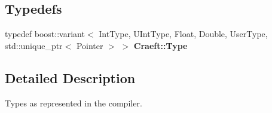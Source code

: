 \subsection*{Typedefs}
\begin{DoxyCompactItemize}
\item 
\hypertarget{_type_8hh_a6507025a334dad2cea0667990ee49050}{}\label{_type_8hh_a6507025a334dad2cea0667990ee49050} 
typedef boost\+::variant$<$ Int\+Type, U\+Int\+Type, Float, Double, User\+Type, std\+::unique\+\_\+ptr$<$ Pointer $>$ $>$ {\bfseries Craeft\+::\+Type}
\end{DoxyCompactItemize}


\subsection{Detailed Description}
Types as represented in the compiler. 

